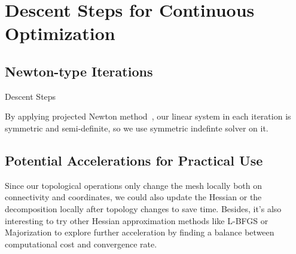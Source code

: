 \section{Descent Steps for Continuous Optimization}

\subsection{Newton-type Iterations}

\begin{algorithm}[h]
\SetAlgoLined
{}
\caption{Descent Steps}
\end{algorithm}
By applying projected Newton method~\cite{Teran2005Robust}, our linear system in each iteration is symmetric and semi-definite, so we use symmetric indefinte solver on it.

\subsection{Potential Accelerations for Practical Use}

Since our topological operations only change the mesh locally both on connectivity and coordinates, we could also update the Hessian or the decomposition locally after topology changes to save time. Besides, it's also interesting to try other Hessian approximation methods like L-BFGS or Majorization to explore further acceleration by finding a balance between computational cost and convergence rate.


